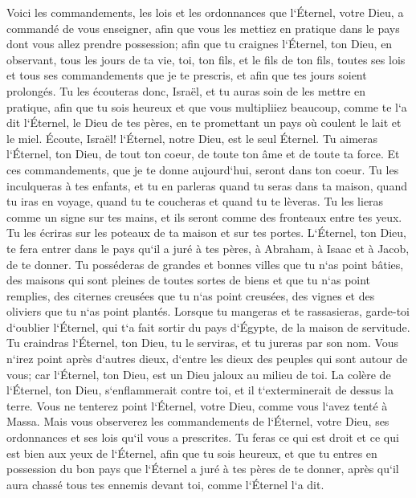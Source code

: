 \verse Voici les commandements, les lois et les ordonnances que l`Éternel, votre Dieu, a commandé de vous enseigner, afin que vous les mettiez en pratique dans le pays dont vous allez prendre possession; 
\verse afin que tu craignes l`Éternel, ton Dieu, en observant, tous les jours de ta vie, toi, ton fils, et le fils de ton fils, toutes ses lois et tous ses commandements que je te prescris, et afin que tes jours soient prolongés. 
\verse Tu les écouteras donc, Israël, et tu auras soin de les mettre en pratique, afin que tu sois heureux et que vous multipliiez beaucoup, comme te l`a dit l`Éternel, le Dieu de tes pères, en te promettant un pays où coulent le lait et le miel. 
\verse Écoute, Israël! l`Éternel, notre Dieu, est le seul Éternel. 
\verse Tu aimeras l`Éternel, ton Dieu, de tout ton coeur, de toute ton âme et de toute ta force. 
\verse Et ces commandements, que je te donne aujourd`hui, seront dans ton coeur. 
\verse Tu les inculqueras à tes enfants, et tu en parleras quand tu seras dans ta maison, quand tu iras en voyage, quand tu te coucheras et quand tu te lèveras. 
\verse Tu les lieras comme un signe sur tes mains, et ils seront comme des fronteaux entre tes yeux. 
\verse Tu les écriras sur les poteaux de ta maison et sur tes portes. 
\verse L`Éternel, ton Dieu, te fera entrer dans le pays qu`il a juré à tes pères, à Abraham, à Isaac et à Jacob, de te donner. Tu posséderas de grandes et bonnes villes que tu n`as point bâties, 
\verse des maisons qui sont pleines de toutes sortes de biens et que tu n`as point remplies, des citernes creusées que tu n`as point creusées, des vignes et des oliviers que tu n`as point plantés. 
\verse Lorsque tu mangeras et te rassasieras, garde-toi d`oublier l`Éternel, qui t`a fait sortir du pays d`Égypte, de la maison de servitude. 
\verse Tu craindras l`Éternel, ton Dieu, tu le serviras, et tu jureras par son nom. 
\verse Vous n`irez point après d`autres dieux, d`entre les dieux des peuples qui sont autour de vous; 
\verse car l`Éternel, ton Dieu, est un Dieu jaloux au milieu de toi. La colère de l`Éternel, ton Dieu, s`enflammerait contre toi, et il t`exterminerait de dessus la terre. 
\verse Vous ne tenterez point l`Éternel, votre Dieu, comme vous l`avez tenté à Massa. 
\verse Mais vous observerez les commandements de l`Éternel, votre Dieu, ses ordonnances et ses lois qu`il vous a prescrites. 
\verse Tu feras ce qui est droit et ce qui est bien aux yeux de l`Éternel, afin que tu sois heureux, et que tu entres en possession du bon pays que l`Éternel a juré à tes pères de te donner, 
\verse après qu`il aura chassé tous tes ennemis devant toi, comme l`Éternel l`a dit. 
